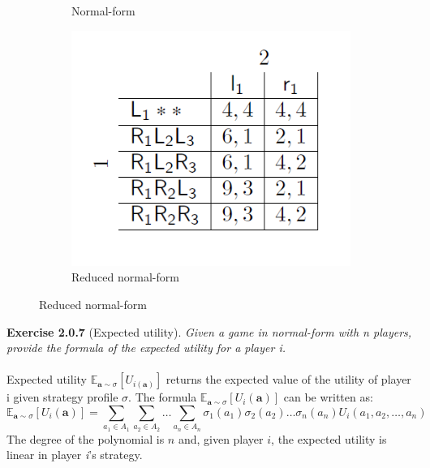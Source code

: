 \begin{figure}[H]
\begin{subfigure}[t]{0.3\textwidth}
 \caption{Normal-form}
\end{subfigure}\hfill
\begin{subfigure}[t]{0.3\textwidth}
 \includegraphics[width=\textwidth]{images/img_1_2_03.png}
 \caption{Reduced normal-form}
\end{subfigure}
\end{figure}
\noindent
\textbf{Exercise 2.0.7} (Expected utility). \textit{Given a game in normal-form with n players, provide the formula of the
expected utility for a player i.}\\\\
Expected utility $ \mathbb{E}_{\mathbf{a} \sim \sigma} [U_{i(\mathbf{a})}] $ returns the expected value of the utility of player i given strategy profile $ \sigma $. The formula $ \mathbb{E}_{\mathbf{a} \sim \sigma} [U_{i}(\mathbf{a})] $ can be written as:
$$
\mathbb{E}_{\mathbf{a} \sim \sigma} [U_{i}(\mathbf{a})] = 
\sum_{a_{1} \in A_{1}} \sum_{a_{2} \in A_{2}} \ldots \sum_{a_{n} \in A_{n}}
\sigma_{1}(a_{1}) \sigma_{2}(a_{2}) \ldots \sigma_{n}(a_{n})
U_{i}(a_{1}, a_{2}, \ldots, a_{n})
$$
The degree of the polynomial is $ n $ and, given player $ i $, the expected utility is linear in player \textit{i}'s strategy.\\\\

